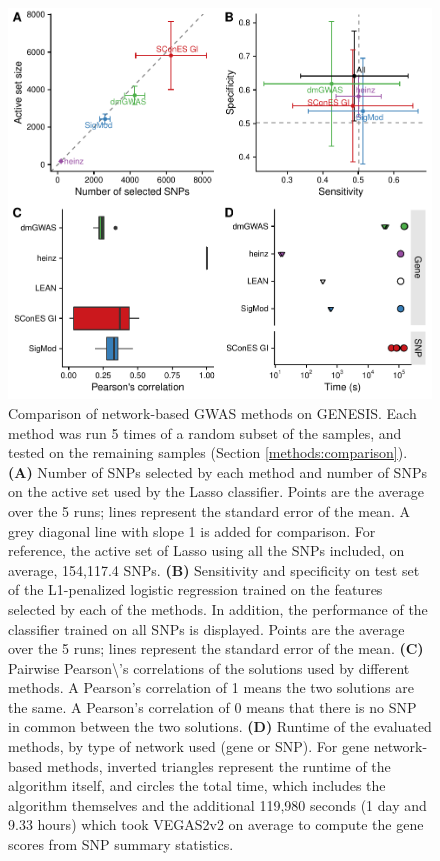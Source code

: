 \documentclass[
  11pt,
]{env/yjiao}
\begin{document}
\begin{figure}

{\centering \includegraphics[width=0.8\linewidth]{fig/figure_4} 

}

\caption{Comparison of network-based GWAS methods on GENESIS. Each method was run 5 times of a random subset of the samples, and tested on the remaining samples (Section \ref{methods:comparison}). \textbf{(A)} Number of SNPs selected by each method and number of SNPs on the active set used by the Lasso classifier. Points are the average over the 5 runs; lines represent the standard error of the mean. A grey diagonal line with slope 1 is added for comparison. For reference, the active set of Lasso using all the SNPs included, on average, 154,117.4 SNPs. \textbf{(B)} Sensitivity and specificity on test set of the L1-penalized logistic regression trained on the features selected by each of the methods. In addition, the performance of the classifier trained on all SNPs is displayed. Points are the average over the 5 runs; lines represent the standard error of the mean. \textbf{(C)} Pairwise Pearson\textbackslash's correlations of the solutions used by different methods. A Pearson's correlation of 1 means the two solutions are the same. A Pearson's correlation of 0 means that there is no SNP in common between the two solutions. \textbf{(D)} Runtime of the evaluated methods, by type of network used (gene or SNP). For gene network-based methods, inverted triangles represent the runtime of the algorithm itself, and circles the total time, which includes the algorithm themselves and the additional 119,980 seconds (1 day and 9.33 hours) which took VEGAS2v2 on average to compute the gene scores from SNP summary statistics.}\label{fig:benchmark}
\end{figure}
\end{document}
